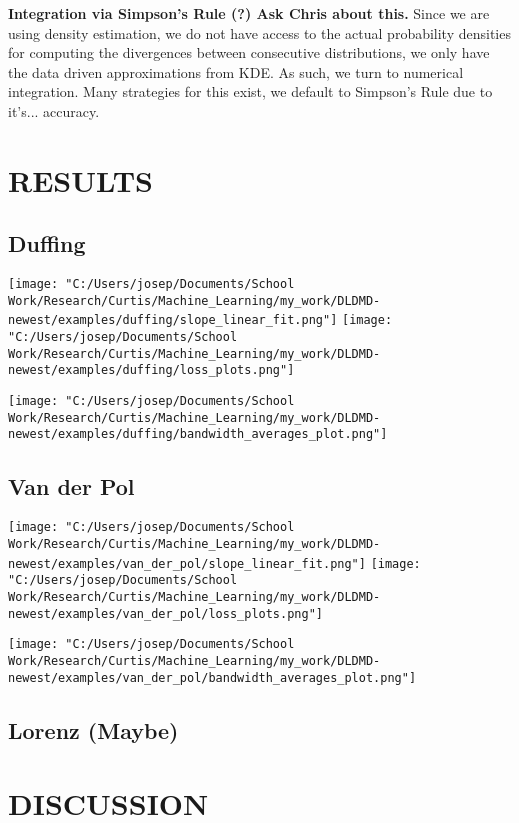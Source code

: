 \textbf{Integration via Simpson's Rule (?) Ask Chris about this.}
Since we are using density estimation, we do not have access to the actual probability
densities for computing the divergences between consecutive distributions, we only 
have the data driven approximations from KDE. As such, we turn to numerical integration.
Many strategies for this exist, we default to Simpson's Rule due to it's... accuracy.



\chapter{RESULTS} \label{chapter:middle}

\section{Duffing}
\begin{center}
    \texttt{[image: "C:/Users/josep/Documents/School Work/Research/Curtis/Machine\_Learning/my\_work/DLDMD-newest/examples/duffing/slope\_linear\_fit.png"]} 
    \texttt{[image: "C:/Users/josep/Documents/School Work/Research/Curtis/Machine\_Learning/my\_work/DLDMD-newest/examples/duffing/loss\_plots.png"]} 
\end{center}

\begin{center}
    \texttt{[image: "C:/Users/josep/Documents/School Work/Research/Curtis/Machine\_Learning/my\_work/DLDMD-newest/examples/duffing/bandwidth\_averages\_plot.png"]} 
\end{center}

\section{Van der Pol}
\begin{center}
    \texttt{[image: "C:/Users/josep/Documents/School Work/Research/Curtis/Machine\_Learning/my\_work/DLDMD-newest/examples/van\_der\_pol/slope\_linear\_fit.png"]}
    \texttt{[image: "C:/Users/josep/Documents/School Work/Research/Curtis/Machine\_Learning/my\_work/DLDMD-newest/examples/van\_der\_pol/loss\_plots.png"]}
\end{center}

\begin{center}
    \texttt{[image: "C:/Users/josep/Documents/School Work/Research/Curtis/Machine\_Learning/my\_work/DLDMD-newest/examples/van\_der\_pol/bandwidth\_averages\_plot.png"]} 
\end{center}
\section{Lorenz (Maybe)}

\chapter{DISCUSSION}

